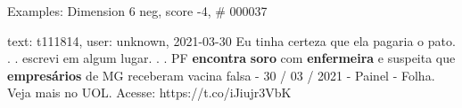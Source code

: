 \begin{frame}{Examples: Dimension 6 neg, score -4, \# 000037}
\footnotesize
\begin{alertblock}{text: t111814, user: unknown, 2021-03-30}
Eu tinha certeza que ela pagaria o pato. . . escrevi em algum lugar. . . PF 
\textbf{encontra} \textbf{soro} com \textbf{enfermeira} e suspeita que 
\textbf{empresários} de MG receberam vacina falsa - 30 / 03 / 2021 - Painel - 
Folha. Veja mais no UOL. Acesse: https://t.co/iJiujr3VbK 
\end{alertblock}
\end{frame}
